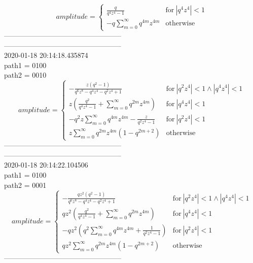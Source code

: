 \documentclass{jsreport}
\begin{document}
$$amplitude = \begin{cases} \frac{q}{q^{4} z^{4} - 1} & \text{for}\: \left|{q^{4} z^{4}}\right| < 1 \\- q \sum_{m=0}^{\infty} q^{4 m} z^{4 m} & \text{otherwise} \end{cases}$$
--------------------------------------------------\\
--------------------------------------------------\\
2020-01-18 20:14:18.435874\\
path1 = 0100\\
path2 = 0010\\
$$amplitude = \begin{cases} - \frac{z \left(q^{2} - 1\right)}{q^{6} z^{8} - q^{4} z^{4} - q^{2} z^{4} + 1} & \text{for}\: \left|{q^{2} z^{4}}\right| < 1 \wedge \left|{q^{4} z^{4}}\right| < 1 \\z \left(\frac{q^{2}}{q^{4} z^{4} - 1} + \sum_{m=0}^{\infty} q^{2 m} z^{4 m}\right) & \text{for}\: \left|{q^{4} z^{4}}\right| < 1 \\- q^{2} z \sum_{m=0}^{\infty} q^{4 m} z^{4 m} - \frac{z}{q^{2} z^{4} - 1} & \text{for}\: \left|{q^{2} z^{4}}\right| < 1 \\z \sum_{m=0}^{\infty} q^{2 m} z^{4 m} \left(1 - q^{2 m + 2}\right) & \text{otherwise} \end{cases}$$
--------------------------------------------------\\
--------------------------------------------------\\
2020-01-18 20:14:22.104506\\
path1 = 0100\\
path2 = 0001\\
$$amplitude = \begin{cases} - \frac{q z^{2} \left(q^{2} - 1\right)}{q^{6} z^{8} - q^{4} z^{4} - q^{2} z^{4} + 1} & \text{for}\: \left|{q^{2} z^{4}}\right| < 1 \wedge \left|{q^{4} z^{4}}\right| < 1 \\q z^{2} \left(\frac{q^{2}}{q^{4} z^{4} - 1} + \sum_{m=0}^{\infty} q^{2 m} z^{4 m}\right) & \text{for}\: \left|{q^{4} z^{4}}\right| < 1 \\- q z^{2} \left(q^{2} \sum_{m=0}^{\infty} q^{4 m} z^{4 m} + \frac{1}{q^{2} z^{4} - 1}\right) & \text{for}\: \left|{q^{2} z^{4}}\right| < 1 \\q z^{2} \sum_{m=0}^{\infty} q^{2 m} z^{4 m} \left(1 - q^{2 m + 2}\right) & \text{otherwise} \end{cases}$$
--------------------------------------------------\\
\end{document}
